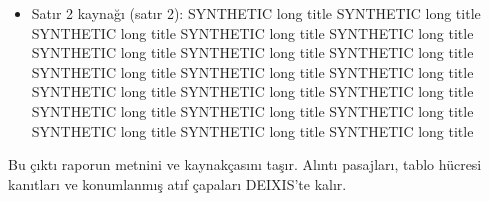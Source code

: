\documentclass[journal]{IEEEtran}
\begin{document}
\begin{itemize}
\item[5.] Satır 2 kaynağı (satır 2): SYNTHETIC long title SYNTHETIC long title SYNTHETIC long title SYNTHETIC long title SYNTHETIC long title SYNTHETIC long title SYNTHETIC long title SYNTHETIC long title SYNTHETIC long title SYNTHETIC long title SYNTHETIC long title SYNTHETIC long title SYNTHETIC long title SYNTHETIC long title SYNTHETIC long title SYNTHETIC long title SYNTHETIC long title SYNTHETIC long title SYNTHETIC long title SYNTHETIC long title
\end{itemize}

Bu çıktı raporun metnini ve kaynakçasını taşır. Alıntı pasajları, tablo hücresi kanıtları ve konumlanmış atıf çapaları DEIXIS'te kalır.




\end{document}
